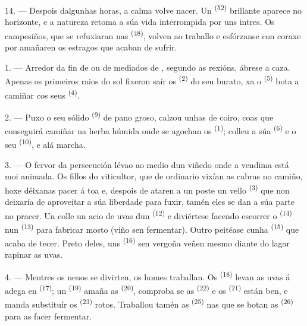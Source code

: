14. --- Despois dalgunhas horas, a calma volve nacer. Un 
\textsuperscript{(52)} brillante aparece no horizonte, e a natureza retoma a súa vida
interrompida por uns intres. Os campesiños, que se refuxiaran nas 
\textsuperscript{(48)}, volven ao traballo e esfórzanse con coraxe por amañaren os estragos
que acaban de sufrir.

\VUsaut{6.0mm}
\VUsaut{3.6mm}

\VUsaut{1.4mm}
\VUsaut{4.0mm}

1. --- Arredor da fin de  ou de mediados de , segundo as
rexións, ábrese a caza. Apenas os primeiros raios do sol fixeron saír os
 \textsuperscript{(2)} do seu burato, xa o 
\textsuperscript{(5)} bota a camiñar cos seus  \textsuperscript{(4)}.

2. --- Puxo o seu sólido  \textsuperscript{(9)} de pano groso, calzou
unhas  de coiro, coas que conseguirá camiñar na herba húmida onde se agochan
os  \textsuperscript{(1)}; colleu a súa
 \textsuperscript{(6)} e o seu 
\textsuperscript{(10)}, e alá marcha.

3. --- O fervor da persecución lévao ao medio dun viñedo onde a vendima está moi animada. Os
fillos do viticultor, que de ordinario vixían as cabras no camiño, hoxe déixanas pacer á toa
e, despois de ataren a un poste un vello  \textsuperscript{(3)} que non
deixaría de aproveitar a súa liberdade para fuxir, tamén eles se dan a súa parte no pracer. Un
colle un acio de uvas dun  \textsuperscript{(12)} e diviértese
facendo escorrer o  \textsuperscript{(14)} nun 
\textsuperscript{(13)} para fabricar mosto (viño sen fermentar). Outro peitéase cunha
 \textsuperscript{(15)} que acaba de tecer. Preto deles, uns
 \textsuperscript{(16)} sen vergoña veñen mesmo diante do lagar rapinar as
uvas.

4. --- Mentres os nenos se divirten, os homes traballan. Os 
\textsuperscript{(18)} levan as uvas á adega en 
\textsuperscript{(17)}; un  \textsuperscript{(19)} amaña as
 \textsuperscript{(20)}, comproba se as 
\textsuperscript{(22)} e os  \textsuperscript{(21)} están ben, e manda
substituír os  \textsuperscript{(23)} rotos. Traballou tamén as
 \textsuperscript{(25)} nas que se botan as 
\textsuperscript{(26)} para as facer fermentar.


